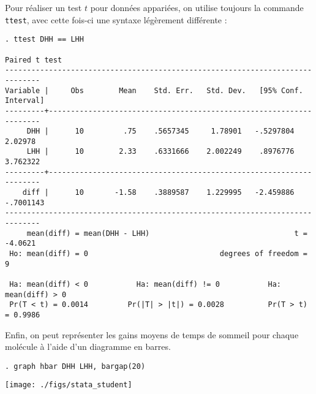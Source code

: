 Pour réaliser un test $t$ pour données appariées, on utilise toujours la
commande \verb|ttest|, avec cette fois-ci une syntaxe légèrement
différente :
\begin{verbatim}
. ttest DHH == LHH

Paired t test
------------------------------------------------------------------------------
Variable |     Obs        Mean    Std. Err.   Std. Dev.   [95% Conf. Interval]
---------+--------------------------------------------------------------------
     DHH |      10         .75    .5657345     1.78901   -.5297804     2.02978
     LHH |      10        2.33    .6331666    2.002249    .8976776    3.762322
---------+--------------------------------------------------------------------
    diff |      10       -1.58    .3889587    1.229995   -2.459886   -.7001143
------------------------------------------------------------------------------
     mean(diff) = mean(DHH - LHH)                                 t =  -4.0621
 Ho: mean(diff) = 0                              degrees of freedom =        9

 Ha: mean(diff) < 0           Ha: mean(diff) != 0           Ha: mean(diff) > 0
 Pr(T < t) = 0.0014         Pr(|T| > |t|) = 0.0028          Pr(T > t) = 0.9986
\end{verbatim}

Enfin, on peut représenter les gains moyens de temps de sommeil pour
chaque molécule à l'aide d'un diagramme en barres.
\begin{verbatim}
. graph hbar DHH LHH, bargap(20)
\end{verbatim}
\texttt{[image: ./figs/stata\_student]}

